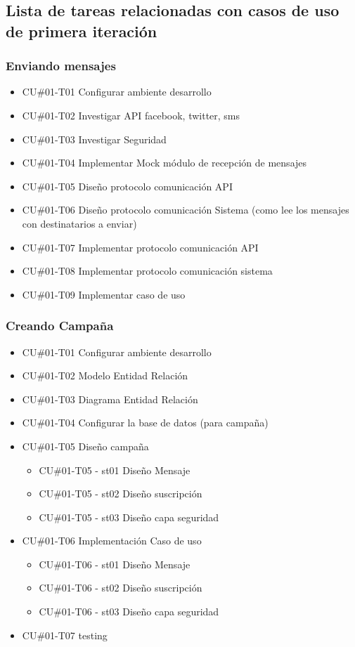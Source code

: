 \documentclass[a4paper, 11pt]{article}
\begin{document}
\subsection{Lista de tareas relacionadas con casos de uso de primera iteraci\'on}
\subsubsection{Enviando mensajes}
\begin{itemize}
\item{CU\#01-T01} Configurar ambiente desarrollo
\item{CU\#01-T02} Investigar API facebook, twitter, sms
\item{CU\#01-T03} Investigar Seguridad
\item{CU\#01-T04} Implementar Mock m\'odulo de recepci\'on de mensajes
\item{CU\#01-T05} Dise\~no protocolo comunicaci\'on API 
\item{CU\#01-T06} Dise\~no protocolo comunicaci\'on Sistema  (como lee los mensajes con destinatarios a enviar)
\item{CU\#01-T07} Implementar protocolo comunicaci\'on API
\item{CU\#01-T08} Implementar protocolo comunicaci\'on sistema
\item{CU\#01-T09} Implementar caso de uso
\end{itemize}

\subsubsection{Creando Campa\~na}
\begin{itemize}
\item{CU\#01-T01} Configurar ambiente desarrollo
\item{CU\#01-T02} Modelo Entidad Relaci\'on
\item{CU\#01-T03} Diagrama Entidad Relaci\'on
\item{CU\#01-T04} Configurar la base de datos (para campa\~na)
\item{CU\#01-T05} Dise\~no campa\~na
\begin{itemize}
\item{CU\#01-T05 - st01} Dise\~no Mensaje
\item{CU\#01-T05 - st02} Dise\~no suscripci\'on
\item{CU\#01-T05 - st03} Dise\~no capa seguridad
\end{itemize}
\item{CU\#01-T06} Implementaci\'on Caso de uso
\begin{itemize}
\item{CU\#01-T06 - st01} Dise\~no Mensaje
\item{CU\#01-T06 - st02} Dise\~no suscripci\'on
\item{CU\#01-T06 - st03} Dise\~no capa seguridad
\end{itemize}
\item{CU\#01-T07} testing
\end{itemize}
\end{document}
